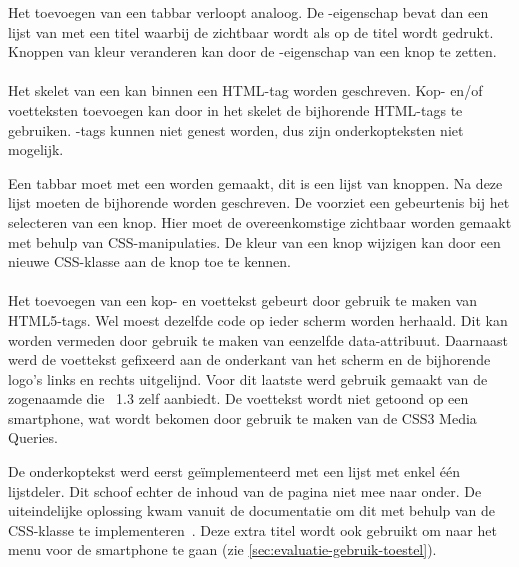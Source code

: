 Het toevoegen van een tabbar verloopt analoog.
De -eigenschap bevat dan een lijst van  met een titel waarbij de  zichtbaar wordt als op de titel wordt gedrukt.
Knoppen van kleur veranderen kan door de -eigenschap van een knop te zetten.

\paragraph{\kendo}
Het skelet van een  kan binnen een HTML-tag worden geschreven.
Kop- en/of voetteksten toevoegen kan door in het skelet de bijhorende HTML-tags te gebruiken.
-tags kunnen niet genest worden, dus zijn onderkopteksten niet mogelijk.

Een tabbar moet met een  worden gemaakt,  dit is een lijst van knoppen.
Na deze lijst moeten de bijhorende  worden geschreven.
De  voorziet een gebeurtenis bij het selecteren van een knop.
Hier moet de overeenkomstige  zichtbaar worden gemaakt met behulp van CSS-manipulaties.
De kleur van een knop wijzigen kan door een nieuwe CSS-klasse aan de knop toe te kennen.

\paragraph{\jqm}
Het toevoegen van een kop- en voettekst gebeurt door gebruik te maken van HTML5-tags. 
Wel moest dezelfde code op ieder scherm worden herhaald. 
Dit kan worden vermeden door gebruik te maken van eenzelfde data-attribuut. 
Daarnaast werd de voettekst gefixeerd aan de onderkant van het scherm en de bijhorende logo's links en rechts uitgelijnd. 
Voor dit laatste werd gebruik gemaakt van de zogenaamde  die \jqm{}~1.3 zelf aanbiedt. 
De voettekst wordt niet getoond op een smartphone, wat wordt bekomen door gebruik te maken van de CSS3 Media Queries.

De onderkoptekst werd eerst geïmplementeerd met een lijst met enkel één lijstdeler.
Dit schoof echter de inhoud van de pagina niet mee naar onder. 
De uiteindelijke oplossing kwam vanuit de documentatie om dit met behulp van de CSS-klasse  te implementeren~\cite{JQuery2013b}. 
Deze extra titel wordt ook gebruikt om naar het menu voor de smartphone te gaan (zie \ref{sec:evaluatie-gebruik-toestel}).


